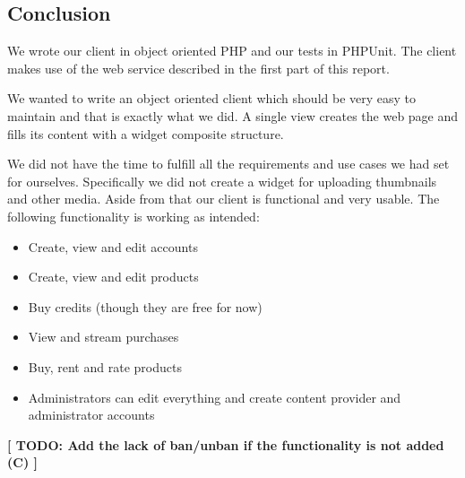 \subsection{Conclusion}
We wrote our client in object oriented PHP and our tests in PHPUnit. The client makes use of the web service described in the first part of this report.

We wanted to write an object oriented client which should be very easy to maintain and that is exactly what we did. A single view creates the web page and fills its content with a widget composite structure.

We did not have the time to fulfill all the requirements and use cases we had set for ourselves. Specifically we did not create a widget for uploading thumbnails and other media. Aside from that our client is functional and very usable. The following functionality is working as intended:
\begin{itemize}
\item Create, view and edit accounts
\item Create, view and edit products
\item Buy credits (though they are free for now)
\item View and stream purchases
\item Buy, rent and rate products
\item Administrators can edit everything and create content provider and administrator accounts
\end{itemize}

\textbf{[ TODO: Add the lack of ban/unban if the functionality is not added (C) ]}
\newpage
